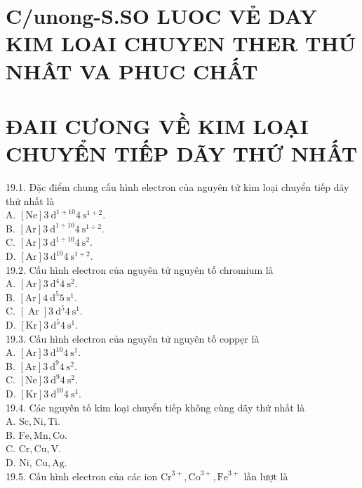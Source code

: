 \documentclass[10pt]{article}
\begin{document}
\section*{C/unong-S.SO LUOC VẺ DAY KIM LOAI CHUYEN THER THÚ NHÂT VA PHUC CHẤT}
\section*{ĐAII CƯONG VỀ KIM LOẠI CHUYỂN TIẾP DÃY THỨ NHẤT}
19.1. Đặc điểm chung cấu hình electron của nguyên tử kim loại chuyển tiếp dãy thứ nhất là\\
A. $[\mathrm{Ne}] 3 \mathrm{~d}^{1+10} 4 \mathrm{~s}^{1+2}$.\\
B. $[\mathrm{Ar}] 3 \mathrm{~d}^{1 \div 10} 4 \mathrm{~s}^{1 \div 2}$.\\
C. $[\mathrm{Ar}] 3 \mathrm{~d}^{1 \div 10} 4 \mathrm{~s}^{2}$.\\
D. $[\mathrm{Ar}] 3 \mathrm{~d}^{10} 4 \mathrm{~s}^{1 \div 2}$.\\
19.2. Cấu hình electron của nguyên tử nguyên tố chromium là\\
A. $[\mathrm{Ar}] 3 \mathrm{~d}^{4} 4 \mathrm{~s}^{2}$.\\
B. $[\mathrm{Ar}] 4 \mathrm{~d}^{5} 5 \mathrm{~s}^{1}$.\\
C. $[\operatorname{Ar}] 3 \mathrm{~d}^{5} 4 \mathrm{~s}^{1}$.\\
D. $[\mathrm{Kr}] 3 \mathrm{~d}^{5} 4 \mathrm{~s}^{1}$.\\
19.3. Cấu hình electron của nguyên tử nguyên tố coppẹr là\\
A. $[\mathrm{Ar}] 3 \mathrm{~d}^{10} 4 \mathrm{~s}^{1}$.\\
B. $[\mathrm{Ar}] 3 \mathrm{~d}^{9} 4 \mathrm{~s}^{2}$.\\
C. $[\mathrm{Ne}] 3 \mathrm{~d}^{9} 4 \mathrm{~s}^{2}$.\\
D. $[\mathrm{Kr}] 3 \mathrm{~d}^{10} 4 \mathrm{~s}^{1}$.\\
19.4. Các nguyên tố kim loại chuyển tiếp không cùng dãy thứ nhất là\\
A. $\mathrm{Sc}, \mathrm{Ni}, \mathrm{Ti}$.\\
B. $\mathrm{Fe}, \mathrm{Mn}, \mathrm{Co}$.\\
C. $\mathrm{Cr}, \mathrm{Cu}, \mathrm{V}$.\\
D. Ni, $\mathrm{Cu}, \mathrm{Ag}$.\\
19.5. Cấu hình electron của các ion $\mathrm{Cr}^{3+}, \mathrm{Co}^{3+}, \mathrm{Fe}^{3+}$ lần lượt là\\
\end{document}
